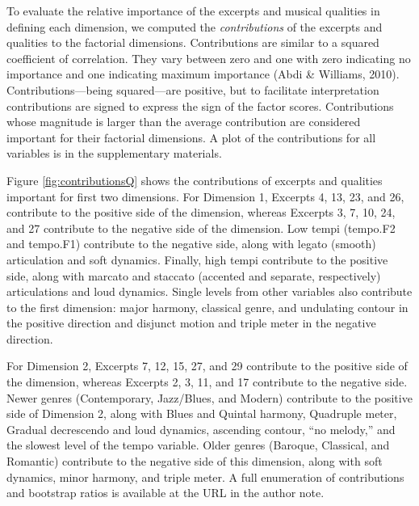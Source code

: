 \documentclass[
  english,
  man,floatsintext]{apa6}
\begin{document}
To evaluate the relative importance of the excerpts and musical qualities in defining each dimension, we computed the \emph{contributions} of the excerpts and qualities to the factorial dimensions. Contributions are similar to a squared coefficient of correlation. They vary between zero and one with zero indicating no importance and one indicating maximum importance (Abdi \& Williams, 2010). Contributions---being squared---are positive, but to facilitate interpretation contributions are signed to express the sign of the factor scores. Contributions whose magnitude is larger than the average contribution are considered important for their factorial dimensions. A plot of the contributions for all variables is in the supplementary materials.

Figure \ref{fig:contributionsQ} shows the contributions of excerpts and qualities important for first two dimensions. For Dimension 1, Excerpts 4, 13, 23, and 26, contribute to the positive side of the dimension, whereas Excerpts 3, 7, 10, 24, and 27 contribute to the negative side of the dimension. Low tempi (tempo.F2 and tempo.F1) contribute to the negative side, along with legato (smooth) articulation and soft dynamics. Finally, high tempi contribute to the positive side, along with marcato and staccato (accented and separate, respectively) articulations and loud dynamics. Single levels from other variables also contribute to the first dimension: major harmony, classical genre, and undulating contour in the positive direction and disjunct motion and triple meter in the negative direction.

For Dimension 2, Excerpts 7, 12, 15, 27, and 29 contribute to the positive side of the dimension, whereas Excerpts 2, 3, 11, and 17 contribute to the negative side. Newer genres (Contemporary, Jazz/Blues, and Modern) contribute to the positive side of Dimension 2, along with Blues and Quintal harmony, Quadruple meter, Gradual decrescendo and loud dynamics, ascending contour, ``no melody,'' and the slowest level of the tempo variable. Older genres (Baroque, Classical, and Romantic) contribute to the negative side of this dimension, along with soft dynamics, minor harmony, and triple meter. A full enumeration of contributions and bootstrap ratios is available at the URL in the author note.
\end{document}
